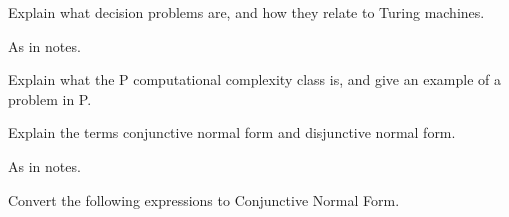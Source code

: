 \begin{questions}
\begin{solution}
\end{solution}

\question
Explain what decision problems are, and how they relate to Turing machines.
\begin{solution}
As in notes.
\end{solution}

\question
Explain what the P computational complexity class is, and give an example of a problem in P.



\question
Explain the terms conjunctive normal form and disjunctive normal form.
\begin{solution}
As in notes.
\end{solution}


\question
Convert the following expressions to Conjunctive Normal Form.
\begin{solution}
\begin{parts}

\end{parts}
\end{solution}
\end{questions}
